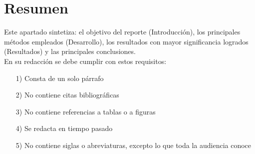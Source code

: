 \chapter*{\centering Resumen}

Este apartado sintetiza: el objetivo del reporte (Introducción), los principales métodos empleados (Desarrollo), los resultados con mayor significancia logrados (Resultados) y las principales conclusiones.\\

En su redacción se debe cumplir con estos requisitos:
\begin{itemize}
	\item[1)] Consta de un solo párrafo
	\item[2)] No contiene citas bibliográficas 
	\item[3)] No contiene referencias a tablas o a figuras
	\item[4)] Se redacta en tiempo pasado
	\item[5)] No contiene siglas o abreviaturas, excepto lo que toda la audiencia conoce
\end{itemize}

